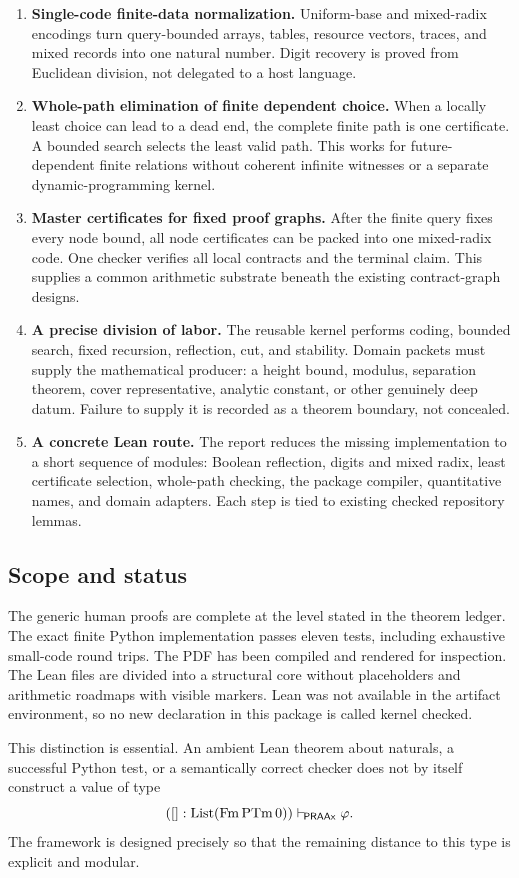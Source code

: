 \begin{enumerate}[label=\textbf{C\arabic*.}]
\item \textbf{Single-code finite-data normalization.}
Uniform-base and mixed-radix encodings turn query-bounded arrays, tables,
resource vectors, traces, and mixed records into one natural number.  Digit
recovery is proved from Euclidean division, not delegated to a host language.

\item \textbf{Whole-path elimination of finite dependent choice.}
When a locally least choice can lead to a dead end, the complete finite path is
one certificate.  A bounded search selects the least valid path.  This works
for future-dependent finite relations without coherent infinite witnesses or a
separate dynamic-programming kernel.

\item \textbf{Master certificates for fixed proof graphs.}
After the finite query fixes every node bound, all node certificates can be
packed into one mixed-radix code.  One checker verifies all local contracts and
the terminal claim.  This supplies a common arithmetic substrate beneath the
existing contract-graph designs.

\item \textbf{A precise division of labor.}
The reusable kernel performs coding, bounded search, fixed recursion,
reflection, cut, and stability.  Domain packets must supply the mathematical
producer: a height bound, modulus, separation theorem, cover representative,
analytic constant, or other genuinely deep datum.  Failure to supply it is
recorded as a theorem boundary, not concealed.

\item \textbf{A concrete Lean route.}
The report reduces the missing implementation to a short sequence of modules:
Boolean reflection, digits and mixed radix, least certificate selection,
whole-path checking, the package compiler, quantitative names, and domain
adapters.  Each step is tied to existing checked repository lemmas.
\end{enumerate}

\subsection{Scope and status}

The generic human proofs are complete at the level stated in the theorem
ledger.  The exact finite Python implementation passes eleven tests, including
exhaustive small-code round trips.  The PDF has been compiled and rendered for
inspection.  The Lean files are divided into a structural core without
placeholders and arithmetic roadmaps with visible  markers.  Lean
was not available in the artifact environment, so no new declaration in this
package is called kernel checked.

This distinction is essential.  An ambient Lean theorem about naturals, a
successful Python test, or a semantically correct checker does not by itself
construct a value of type
\[
  ([]:\operatorname{List}(\mathrm{Fm}\,\mathrm{PTm}\,0))
  \mathrel{\vdash_{\!\mathsf{PRAAx}}} \varphi.
\]
The framework is designed precisely so that the remaining distance to this
type is explicit and modular.

